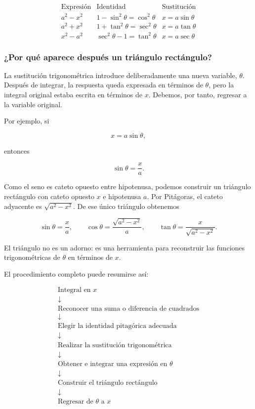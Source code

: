 \[
\boxed{
\begin{array}{c|c|c}
\text{Expresión} & \text{Identidad} & \text{Sustitución}\\ \hline
 a^2-x^2 & 1-\sin^2\theta=\cos^2\theta & x=a\sin\theta\\[2mm]
 a^2+x^2 & 1+\tan^2\theta=\sec^2\theta & x=a\tan\theta\\[2mm]
 x^2-a^2 & \sec^2\theta-1=\tan^2\theta & x=a\sec\theta
\end{array}}
\]

\subsubsection*{¿Por qué aparece después un triángulo rectángulo?}

La sustitución trigonométrica introduce deliberadamente una nueva variable,
$\theta$. Después de integrar, la respuesta queda expresada en términos de
$\theta$, pero la integral original estaba escrita en términos de $x$.
Debemos, por tanto, regresar a la variable original.

Por ejemplo, si

\[
x=a\sin\theta,
\]

entonces

\[
\sin\theta=\frac{x}{a}.
\]

Como el seno es cateto opuesto entre hipotenusa, podemos construir un
triángulo rectángulo con cateto opuesto $x$ e hipotenusa $a$. Por Pitágoras,
el cateto adyacente es $\sqrt{a^2-x^2}$. De ese único triángulo obtenemos

\[
\sin\theta=\frac{x}{a},\qquad
\cos\theta=\frac{\sqrt{a^2-x^2}}{a},\qquad
\tan\theta=\frac{x}{\sqrt{a^2-x^2}}.
\]

El triángulo no es un adorno: es una herramienta para reconstruir las
funciones trigonométricas de $\theta$ en términos de $x$.

El procedimiento completo puede resumirse así:

\[
\boxed{
\begin{array}{c}
\text{Integral en }x\\
\downarrow\\
\text{Reconocer una suma o diferencia de cuadrados}\\
\downarrow\\
\text{Elegir la identidad pitagórica adecuada}\\
\downarrow\\
\text{Realizar la sustitución trigonométrica}\\
\downarrow\\
\text{Obtener e integrar una expresión en }\theta\\
\downarrow\\
\text{Construir el triángulo rectángulo}\\
\downarrow\\
\text{Regresar de }\theta\text{ a }x
\end{array}}
\]

